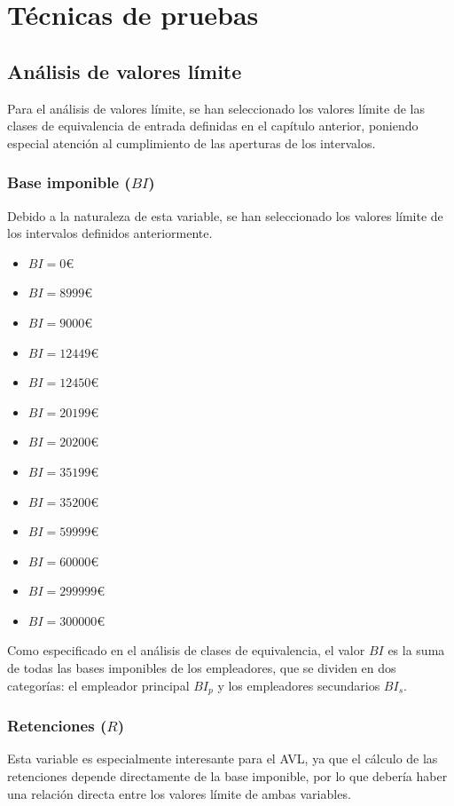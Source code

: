 \chapter{Técnicas de pruebas}
\section{Análisis de valores límite}
Para el análisis de valores límite, se han seleccionado los valores límite de las clases de equivalencia
de entrada definidas en el capítulo anterior, poniendo especial atención al cumplimiento de las aperturas
de los intervalos.

\subsection{Base imponible ($BI$)}
Debido a la naturaleza de esta variable, se han seleccionado los valores límite de los intervalos definidos
anteriormente.
\begin{itemize}
	\item $BI = 0$€
	\item $BI = 8999$€
	\item $BI = 9000$€
	\item $BI = 12449$€
	\item $BI = 12450$€
	\item $BI = 20199$€
	\item $BI = 20200$€
	\item $BI = 35199$€
	\item $BI = 35200$€
	\item $BI = 59999$€
	\item $BI = 60000$€
	\item $BI = 299999$€
	\item $BI = 300000$€
\end{itemize}

Como especificado en el análisis de clases de equivalencia, el valor $BI$ es la suma de todas
las bases imponibles de los empleadores, que se dividen en dos categorías: el empleador principal
$BI_{p}$ y los empleadores secundarios $BI_{s}$.

\newpage{}
\subsection{Retenciones ($R$)}
Esta variable es especialmente interesante para el AVL, ya que el cálculo de las retenciones depende
directamente de la base imponible, por lo que debería haber una relación directa entre los valores límite
de ambas variables.


